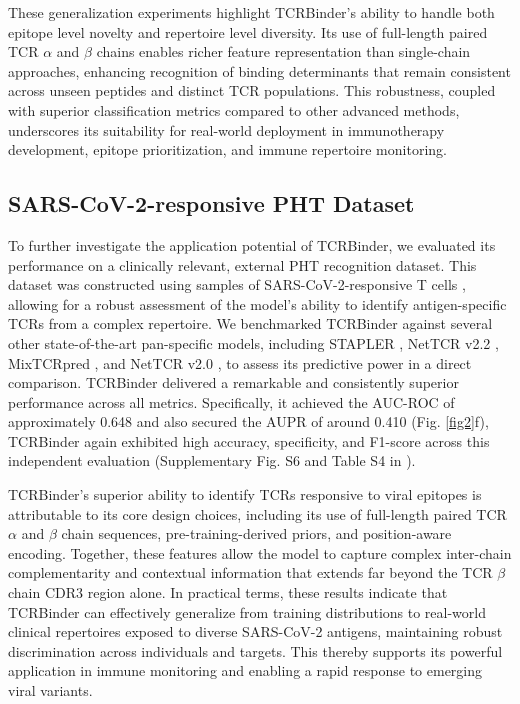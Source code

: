 \documentclass[10pt,letterpaper]{article}
\begin{document}
These generalization experiments highlight TCRBinder’s ability to handle both epitope level novelty and repertoire level diversity. Its use of full-length paired TCR $\alpha$ and $\beta$ chains enables richer feature representation than single-chain approaches, enhancing recognition of binding determinants that remain consistent across unseen peptides and distinct TCR populations. This robustness, coupled with superior classification metrics compared to other advanced methods, underscores its suitability for real-world deployment in immunotherapy development, epitope prioritization, and immune repertoire monitoring.  


\subsection*{SARS-CoV-2-responsive PHT Dataset}
To further investigate the application potential of TCRBinder, we evaluated its performance on a clinically relevant, external PHT recognition dataset. This dataset was constructed using samples of SARS-CoV-2-responsive T cells \cite{ref41}, allowing for a robust assessment of the model's ability to identify antigen-specific TCRs from a complex repertoire. We benchmarked TCRBinder against several other state-of-the-art pan-specific models, including STAPLER \cite{ref37}, NetTCR v2.2 \cite{ref38}, MixTCRpred \cite{ref39},  and NetTCR v2.0 \cite{ref40}, to assess its predictive power in a direct comparison. TCRBinder delivered a remarkable and consistently superior performance across all metrics. Specifically, it achieved the AUC-ROC of approximately 0.648 and also secured the AUPR of around 0.410 (Fig. \ref{fig2}f), TCRBinder again exhibited high accuracy, specificity, and F1-score across this independent evaluation (Supplementary Fig. S6 and Table S4 in ). 

TCRBinder's superior ability to identify TCRs responsive to viral epitopes is attributable to its core design choices, including its use of full-length paired TCR $\alpha$ and $\beta$ chain sequences, pre-training-derived priors, and position-aware encoding. Together, these features allow the model to capture complex inter-chain complementarity and contextual information that extends far beyond the TCR $\beta$ chain CDR3 region alone. In practical terms, these results indicate that TCRBinder can effectively generalize from training distributions to real-world clinical repertoires exposed to diverse SARS-CoV-2 antigens, maintaining robust discrimination across individuals and targets. This thereby supports its powerful application in immune monitoring and enabling a rapid response to emerging viral variants.
\end{document}
